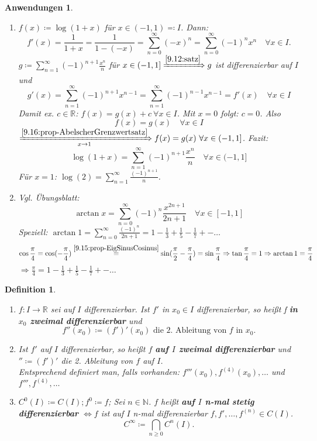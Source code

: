 \documentclass{extreport}
\newcommand{\N}{\mathbb{N}}
\newcommand{\R}{\mathbb{R}}
\theoremstyle{named}
\theoremstyle{dotless}
\newtheorem{anwendungen}[namedtheorem]{Anwendungen}
\newtheorem*{definition}{Definition}
\begin{document}
\begin{anwendungen} ~\ \label{9.17:anwendungen}
	\begin{enumerate}
		\item $f(x) \coloneqq \log(1+x)$ für $x \in (-1, 1) \eqqcolon I$. Dann: \label{9.17.a:anwendungen}
			$$ f'(x) = \frac{1}{1+x} = \frac{1}{1 - (-x)} = \sum_{n=0}^{\infty} (-x)^{n} = \sum_{n=0}^{\infty} (-1)^{n} x^{n} \quad \forall x \in I. $$
			$g \coloneqq \sum_{n=1}^{\infty} (-1)^{n+1} \frac{x^{n}}{n}$ für $x \in (-1, 1] \xRightarrow[]{\ref{9.12:satz}} g$ ist differenzierbar auf $I$ und 
			$$ g'(x) = \sum_{n=1}^{\infty} (-1)^{n+1} x^{n-1} = \sum_{n=1}^{\infty} (-1)^{n-1} x^{n-1} = f'(x) \quad \forall x \in I $$
			Damit ex. $c \in \R$: $f(x) = g(x) + c ~\forall x \in I$. Mit $x = 0$ folgt: $c = 0$. Also
			$$ f(x) = g(x) \quad \forall x \in I $$
			$\xRightarrow[x \rightarrow 1]{\ref{9.16:prop-AbelscherGrenzwertsatz}} f(x) = g(x) ~\forall x \in (-1, 1]$. Fazit:
			$$ \log(1+x) = \sum_{n=1}^{\infty} (-1)^{n+1} \frac{x^{n}}{n} \quad \forall x \in (-1 , 1] $$
			Für $x = 1$: $\log(2) = \sum_{n=1}^{\infty} \frac{(-1)^{n+1}}{n}$. 
		\item Vgl. Übungsblatt: \label{9.17.b:anwendungen}
			$$ \arctan x = \sum_{n=0}^{\infty} (-1)^{n} \frac{x^{2n +1}}{2n + 1} \quad \forall x \in [-1, 1] $$
			Speziell: $\arctan 1 = \sum_{n=0}^{\infty} \frac{(-1)^{n}}{2n + 1} = 1 - \frac{1}{3} + \frac{1}{5} - \frac{1}{7} +- \dotsc$
		$$ \cos \frac{\pi}{4} = \cos(-\frac{\pi}{4}) \overset{\ref{9.15:prop-EigSinusCosinus}}{=} \sin( \frac{\pi}{2} - \frac{\pi}{4}) = \sin \frac{\pi}{4} \Rightarrow \tan \frac{\pi}{4} = 1 \Rightarrow \arctan 1 = \frac{\pi}{4} $$
		$\Rightarrow \frac{\pi}{4} = 1 - \frac{1}{3} + \frac{1}{5} - \frac{1}{7} +- \dotsc$
	\end{enumerate}
\end{anwendungen}

   
\begin{definition} ~\
	\begin{enumerate}
		\item $f \colon I \rightarrow \R$ sei auf $I$ differenzierbar. Ist $f'$ in $x_{0} \in I$ differenzierbar, so hei{\ss}t f \textbf{in $x_{0}$ zweimal differenzierbar} und
		$$ f''(x_{0}) \coloneqq (f')'(x_{0}) \text{ die 2. Ableitung von $f$ in $x_{0}$.} $$
		\item Ist $f'$ auf $I$ differenzierbar, so hei{\ss}t $f$ \textbf{auf $I$ zweimal differenzierbar} und $'' \coloneqq (f')'$ die 2. Ableitung von $f$ auf $I$. \\
			Entsprechend definiert man, falls vorhanden: $f'''(x_{0}), f^{(4)}(x_{0}), \dotsc$ und $f''', f^{(4)}, \dotsc$ 
		\item $C^{0}(I) \coloneqq C(I); f^{0} \coloneqq f$; Sei $n \in \N$. $f$ hei{\ss}t \textbf{auf $I$ n-mal stetig differenzierbar} $\iff f$ ist auf $I$ n-mal differenzierbar $f, f', \dotsc, f^{(n)} \in C(I)$.
			$$ C^{\infty} \coloneqq \bigcap_{n \geq 0} C^{n}(I). $$
	\end{enumerate}
\end{definition}
\end{document}
